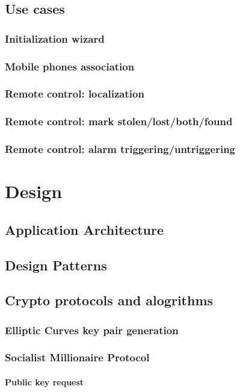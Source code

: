 \documentclass[a4paper,12pt]{article}
\begin{document}
\subsection{Use cases}
\subsubsection{Initialization wizard}
\subsubsection{Mobile phones association}
\subsubsection{Remote control: localization}
\subsubsection{Remote control: mark stolen/lost/both/found}
\subsubsection{Remote control: alarm triggering/untriggering}
\clearpage

\noindent	
\Huge{\section{Design}}
	\subsection{Application Architecture}
	\subsection{Design Patterns}
	\subsection{Crypto protocols and alogrithms}
		\subsubsection{Elliptic Curves key pair generation}
		\subsubsection{Socialist Millionaire Protocol}
			\paragraph{Public key request}
\end{document}
